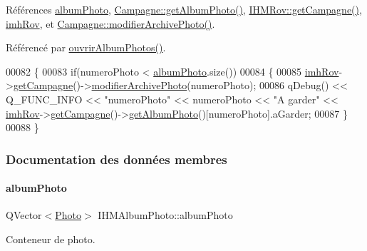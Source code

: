 Références \hyperlink{ihmalbumphoto_8h_source_l00044}{album\+Photo}, \hyperlink{campagne_8cpp_source_l00070}{Campagne\+::get\+Album\+Photo()}, \hyperlink{ihmrov_8cpp_source_l00149}{I\+H\+M\+Rov\+::get\+Campagne()}, \hyperlink{ihmalbumphoto_8h_source_l00045}{imh\+Rov}, et \hyperlink{campagne_8cpp_source_l00085}{Campagne\+::modifier\+Archive\+Photo()}.



Référencé par \hyperlink{ihmalbumphoto_8cpp_source_l00038}{ouvrir\+Album\+Photos()}.


\begin{DoxyCode}
00082 \{
00083     \textcolor{keywordflow}{if}(numeroPhoto < \hyperlink{class_i_h_m_album_photo_a686adeccd626a94d9a4996782c851c61}{albumPhoto}.size())
00084     \{
00085         \hyperlink{class_i_h_m_album_photo_ab7056087d5ed3ee1528bd7f689b46c2a}{imhRov}->\hyperlink{class_i_h_m_rov_ab3e8686eef9233b4c1e6711cf1c4576a}{getCampagne}()->\hyperlink{class_campagne_a7751a5a0b5d1be46384f57b5409163e8}{modifierArchivePhoto}(numeroPhoto);
00086         qDebug() << Q\_FUNC\_INFO << \textcolor{stringliteral}{"numeroPhoto"} << numeroPhoto << \textcolor{stringliteral}{"A garder"} << 
      \hyperlink{class_i_h_m_album_photo_ab7056087d5ed3ee1528bd7f689b46c2a}{imhRov}->\hyperlink{class_i_h_m_rov_ab3e8686eef9233b4c1e6711cf1c4576a}{getCampagne}()->\hyperlink{class_campagne_abec90fcbc0c4ded45caaac9adb454add}{getAlbumPhoto}()[numeroPhoto].aGarder;
00087     \}
00088 \}
\end{DoxyCode}


\subsubsection{Documentation des données membres}
\mbox{\label{class_i_h_m_album_photo_a686adeccd626a94d9a4996782c851c61}} 
\paragraph{\texorpdfstring{album\+Photo}{albumPhoto}}
{\footnotesize\ttfamily Q\+Vector$<$\hyperlink{struct_photo}{Photo}$>$ I\+H\+M\+Album\+Photo\+::album\+Photo\hspace{0.3cm}{\ttfamily [private]}}



Conteneur de photo. 



